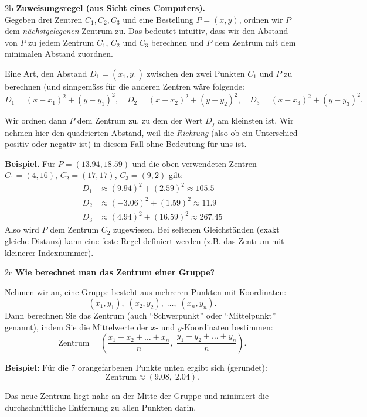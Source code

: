 \begin{aufgabe}{2b}
\textbf{Zuweisungsregel (aus Sicht eines Computers).}\\
Gegeben drei Zentren $C_1,C_2,C_3$ und eine Bestellung $P=(x,y)$, ordnen wir $P$ dem \emph{nächstgelegenen} Zentrum zu. Das bedeutet intuitiv, dass wir den Abstand von $P$ zu jedem Zentrum $C_1$, $C_2$ und $C_3$ berechnen und $P$ dem Zentrum mit dem minimalen Abstand zuordnen. 

Eine Art, den Abstand $D_1 = (x_1, y_1)$ zwischen den zwei Punkten $C_1$ und $P$ zu berechnen (und sinngemäss für die anderen Zentren wäre folgende:
\[
D_1=(x-x_1)^2+(y-y_1)^2,\quad
D_2=(x-x_2)^2+(y-y_2)^2,\quad
D_3=(x-x_3)^2+(y-y_3)^2.
\]

Wir ordnen dann $P$ dem Zentrum zu, zu dem der Wert $D_j$ am kleinsten ist. Wir nehmen hier den quadrierten Abstand, weil die \textit{Richtung} (also ob ein Unterschied positiv oder negativ ist) in diesem Fall ohne Bedeutung für uns ist.


\vspace{0.5em}
\textbf{Beispiel.} Für $P=(13.94,18.59)$ und die oben verwendeten Zentren
$C_1=(4,16)$, $C_2=(17,17)$, $C_3=(9,2)$ gilt:
\[
\begin{aligned}
D_1&\approx (9.94)^2+(2.59)^2\approx 105.5\\
D_2&\approx ({-}3.06)^2+(1.59)^2\approx 11.9\\
D_3&\approx (4.94)^2+(16.59)^2\approx 267.45
\end{aligned}
\]
Also wird $P$ dem Zentrum $C_2$ zugewiesen. Bei seltenen Gleichständen (exakt gleiche Distanz) kann eine feste Regel definiert werden (z.B. das Zentrum mit kleinerer Indexnummer).
\end{aufgabe}



\begin{aufgabe}{2c}
\textbf{Wie berechnet man das Zentrum einer Gruppe?}

Nehmen wir an, eine Gruppe besteht aus mehreren Punkten mit Koordinaten:
\[
(x_1, y_1),\; (x_2, y_2),\; \dots,\; (x_n, y_n).
\]
Dann berechnen Sie das Zentrum (auch ``Schwerpunkt'' oder ``Mittelpunkt'' genannt), indem Sie die Mittelwerte der $x$- und $y$-Koordinaten bestimmen:
\[
\text{Zentrum} = \left(
\frac{x_1 + x_2 + \dots + x_n}{n},\;
\frac{y_1 + y_2 + \dots + y_n}{n}
\right).
\]

\textbf{Beispiel:} Für die 7 orangefarbenen Punkte unten ergibt sich (gerundet):
\[
\text{Zentrum} \approx (9.08,\;2.04).
\]

Das neue Zentrum liegt nahe an der Mitte der Gruppe und minimiert die durchschnittliche Entfernung zu allen Punkten darin.
\end{aufgabe}












